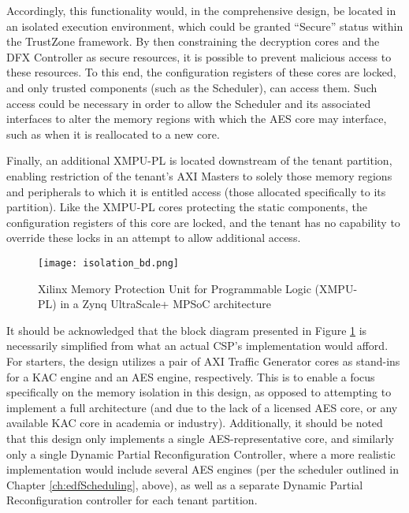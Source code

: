 Accordingly, this functionality would, in the comprehensive design, be located in an isolated execution environment, which could be granted ``Secure'' status within the TrustZone framework. By then constraining the decryption cores and the DFX Controller as secure resources, it is possible to prevent malicious access to these resources. To this end, the configuration registers of these cores are locked, and only trusted components (such as the Scheduler), can access them. Such access could be necessary in order to allow the Scheduler and its associated interfaces to alter the memory regions with which the AES core may interface, such as when it is reallocated to a new core.

Finally, an additional XMPU-PL is located downstream of the tenant partition, enabling restriction of the tenant's AXI Masters to solely those memory regions and peripherals to which it is entitled access (those allocated specifically to its partition). Like the XMPU-PL cores protecting the static components, the configuration registers of this core are locked, and the tenant has no capability to override these locks in an attempt to allow additional access. 

\begin{figure}[H]
    \centering
    \texttt{[image: isolation\_bd.png]}
    \caption [Proposed XMPU-PL Design]{Xilinx Memory Protection Unit for Programmable Logic (XMPU-PL) in a Zynq UltraScale+ MPSoC architecture}
    \label{fig:XMPU-PLDesign}
\end{figure}

It should be acknowledged that the block diagram presented in Figure \ref{fig:XMPU-PLDesign} is necessarily simplified from what an actual CSP's implementation would afford. For starters, the design utilizes a pair of AXI Traffic Generator cores as stand-ins for a KAC engine and an AES engine, respectively. This is to enable a focus specifically on the memory isolation in this design, as opposed to attempting to implement a full architecture (and due to the lack of a licensed AES core, or any available KAC core in academia or industry). Additionally, it should be noted that this design only implements a single AES-representative core, and similarly only a single Dynamic Partial Reconfiguration Controller, where a more realistic implementation would include several AES engines (per the scheduler outlined in Chapter \ref{ch:edfScheduling}, above), as well as a separate Dynamic Partial Reconfiguration controller for each tenant partition. 

